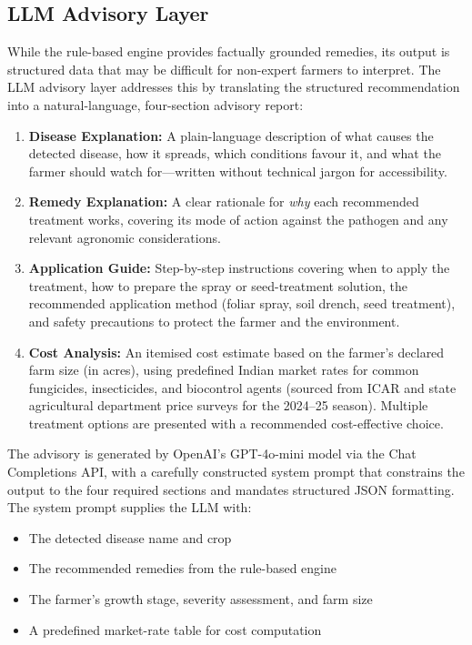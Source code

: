 \documentclass[12pt,a4paper]{report}
\begin{document}
\subsection{LLM Advisory Layer}
While the rule-based engine provides factually grounded remedies, its output is structured data that may be difficult for non-expert farmers to interpret. The LLM advisory layer addresses this by translating the structured recommendation into a natural-language, four-section advisory report:

\begin{enumerate}
    \item \textbf{Disease Explanation:} A plain-language description of what causes the detected disease, how it spreads, which conditions favour it, and what the farmer should watch for---written without technical jargon for accessibility.
    \item \textbf{Remedy Explanation:} A clear rationale for \textit{why} each recommended treatment works, covering its mode of action against the pathogen and any relevant agronomic considerations.
    \item \textbf{Application Guide:} Step-by-step instructions covering when to apply the treatment, how to prepare the spray or seed-treatment solution, the recommended application method (foliar spray, soil drench, seed treatment), and safety precautions to protect the farmer and the environment.
    \item \textbf{Cost Analysis:} An itemised cost estimate based on the farmer's declared farm size (in acres), using predefined Indian market rates for common fungicides, insecticides, and biocontrol agents (sourced from ICAR and state agricultural department price surveys for the 2024--25 season). Multiple treatment options are presented with a recommended cost-effective choice.
\end{enumerate}

The advisory is generated by OpenAI's GPT-4o-mini model via the Chat Completions API, with a carefully constructed system prompt that constrains the output to the four required sections and mandates structured JSON formatting. The system prompt supplies the LLM with:
\begin{itemize}
    \item The detected disease name and crop
    \item The recommended remedies from the rule-based engine
    \item The farmer's growth stage, severity assessment, and farm size
    \item A predefined market-rate table for cost computation
\end{itemize}
\end{document}
